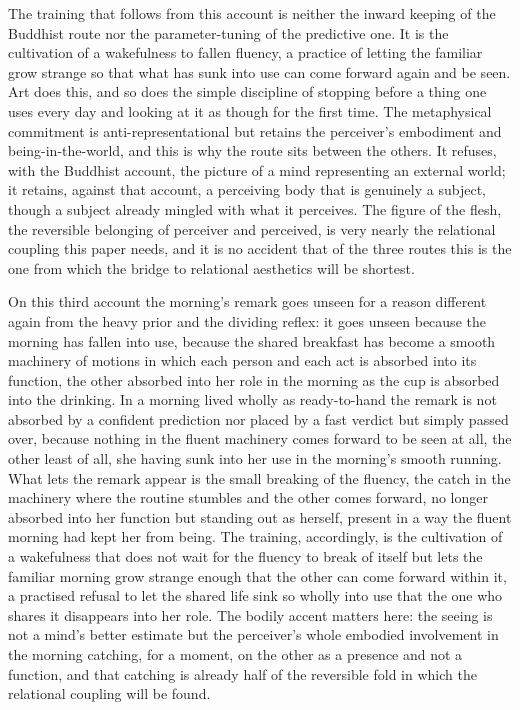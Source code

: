 The training that follows from this account is neither the inward keeping of the Buddhist route nor the parameter-tuning of the predictive one. It is the cultivation of a wakefulness to fallen fluency, a practice of letting the familiar grow strange so that what has sunk into use can come forward again and be seen. Art does this, and so does the simple discipline of stopping before a thing one uses every day and looking at it as though for the first time. The metaphysical commitment is anti-representational but retains the perceiver's embodiment and being-in-the-world, and this is why the route sits between the others. It refuses, with the Buddhist account, the picture of a mind representing an external world; it retains, against that account, a perceiving body that is genuinely a subject, though a subject already mingled with what it perceives. The figure of the flesh, the reversible belonging of perceiver and perceived, is very nearly the relational coupling this paper needs, and it is no accident that of the three routes this is the one from which the bridge to relational aesthetics will be shortest.

On this third account the morning's remark goes unseen for a reason different again from the heavy prior and the dividing reflex: it goes unseen because the morning has fallen into use, because the shared breakfast has become a smooth machinery of motions in which each person and each act is absorbed into its function, the other absorbed into her role in the morning as the cup is absorbed into the drinking. In a morning lived wholly as ready-to-hand the remark is not absorbed by a confident prediction nor placed by a fast verdict but simply passed over, because nothing in the fluent machinery comes forward to be seen at all, the other least of all, she having sunk into her use in the morning's smooth running. What lets the remark appear is the small breaking of the fluency, the catch in the machinery where the routine stumbles and the other comes forward, no longer absorbed into her function but standing out as herself, present in a way the fluent morning had kept her from being. The training, accordingly, is the cultivation of a wakefulness that does not wait for the fluency to break of itself but lets the familiar morning grow strange enough that the other can come forward within it, a practised refusal to let the shared life sink so wholly into use that the one who shares it disappears into her role. The bodily accent matters here: the seeing is not a mind's better estimate but the perceiver's whole embodied involvement in the morning catching, for a moment, on the other as a presence and not a function, and that catching is already half of the reversible fold in which the relational coupling will be found.

